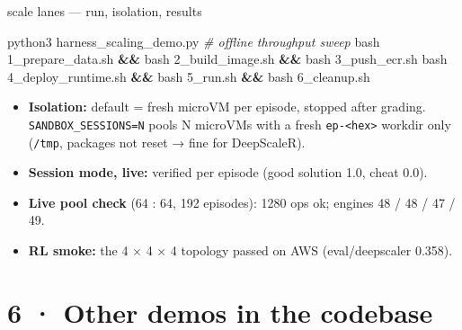 \documentclass[
  10pt,
  ignorenonframetext,
  aspectratio=169,
  t]{beamer}
\newenvironment{Shaded}{}{}
\newcommand{\CommentTok}[1]{\textcolor[rgb]{0.38,0.63,0.69}{\textit{#1}}}
\newcommand{\ExtensionTok}[1]{#1}
\newcommand{\FunctionTok}[1]{\textcolor[rgb]{0.02,0.16,0.49}{#1}}
\newcommand{\KeywordTok}[1]{\textcolor[rgb]{0.00,0.44,0.13}{\textbf{#1}}}
\newcommand{\NormalTok}[1]{#1}
\providecommand{\tightlist}{%
  \setlength{\itemsep}{0pt}\setlength{\parskip}{0pt}}
\begin{document}
\begin{frame}{scale lanes --- run, isolation, results}
\protect\hypertarget{scale-lanes-run-isolation-results}{}
\begin{Shaded}
\begin{Highlighting}[]
\ExtensionTok{python3}\NormalTok{ harness\_scaling\_demo.py   }\CommentTok{\# offline throughput sweep}
\FunctionTok{bash}\NormalTok{ 1\_prepare\_data.sh }\KeywordTok{\&\&} \FunctionTok{bash}\NormalTok{ 2\_build\_image.sh }\KeywordTok{\&\&} \FunctionTok{bash}\NormalTok{ 3\_push\_ecr.sh}
\FunctionTok{bash}\NormalTok{ 4\_deploy\_runtime.sh }\KeywordTok{\&\&} \FunctionTok{bash}\NormalTok{ 5\_run.sh }\KeywordTok{\&\&} \FunctionTok{bash}\NormalTok{ 6\_cleanup.sh}
\end{Highlighting}
\end{Shaded}

\begin{itemize}
\tightlist
\item
  \textbf{Isolation:} default = fresh microVM per episode, stopped after
  grading. \texttt{SANDBOX\_SESSIONS=N} pools N microVMs with a fresh
  \texttt{ep-\textless{}hex\textgreater{}} workdir only (\texttt{/tmp},
  packages not reset → fine for DeepScaleR).
\item
  \textbf{Session mode, live:} verified per episode (good solution 1.0,
  cheat 0.0).
\item
  \textbf{Live pool check} (64 : 64, 192 episodes): 1280 ops ok; engines
  48 / 48 / 47 / 49.
\item
  \textbf{RL smoke:} the 4 × 4 × 4 topology passed on AWS
  (eval/deepscaler 0.358).
\end{itemize}
\end{frame}

\hypertarget{other-demos-in-the-codebase}{%
\section{6 · Other demos in the
codebase}\label{other-demos-in-the-codebase}}
\end{document}
